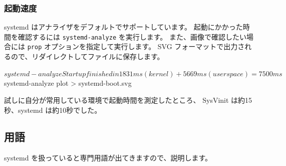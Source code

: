 \documentclass[mingoth,a4paper]{jsarticle}
\begin{document}
\subsubsection{起動速度}

systemd はアナライザをデフォルトでサポートしています。
起動にかかった時間を確認するには \texttt{systemd-analyze} を実行します。
また、画像で確認したい場合には \texttt{prop} オプションを指定して実行します。
SVG フォーマットで出力されるので、リダイレクトしてファイルに保存します。

\begin{commandline}
$ systemd-analyze 
Startup finished in 1831ms (kernel) + 5669ms (userspace) = 7500ms
$ systemd-analyze plot > systemd-boot.svg
\end{commandline}

試しに自分が常用している環境で起動時間を測定したところ、
SysVinit は約15秒、systemd は約10秒でした。 

\subsection{用語}

systemd を扱っていると専門用語が出てきますので、説明します。
\end{document}
